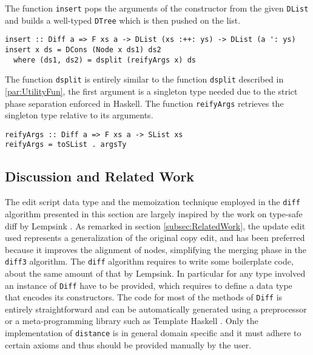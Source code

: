 \documentclass[../Thesis.tex]{subfiles}
\begin{document}
	The function \texttt{insert} pops the arguments of the 
	constructor from the given \texttt{DList} and builds
	a well-typed \texttt{DTree} which is then pushed on the list.

\begin{verbatim}
insert :: Diff a => F xs a -> DList (xs :++: ys) -> DList (a ': ys)
insert x ds = DCons (Node x ds1) ds2
  where (ds1, ds2) = dsplit (reifyArgs x) ds
\end{verbatim}

	The function \texttt{dsplit} is entirely similar to the function
	\texttt{dsplit} described in \ref{par:UtilityFun}, the first 
	argument is a singleton type needed due to the strict
	phase separation enforced in Haskell.
	The function \texttt{reifyArgs} retrieves the singleton
	type relative to its arguments.

\begin{verbatim}
reifyArgs :: Diff a => F xs a -> SList xs
reifyArgs = toSList . argsTy
\end{verbatim}

	\subsection{Discussion and Related Work}
	The edit script data type and the memoization technique 
	employed in the \texttt{diff} algorithm presented in this section
	are largely inspired by the work on type-safe diff by 
	Lempsink \cite{Lemp09}.
	As remarked in section \ref{subsec:RelatedWork}, the update
	edit used represents a generalization of the original copy edit, 
	and has been preferred because it improves the alignment of nodes, 
	simplifying the merging phase in the \texttt{diff3} algorithm.
	The \texttt{diff} algorithm requires to write some boilerplate code, about
	the same amount of that by Lempsink.
	In particular for any type involved an instance of \texttt{Diff} have
	to be provided, which requires to define a data type that encodes its
	constructors.
	The code for most of the methods of \texttt{Diff} is
	entirely straightforward and can be automatically generated using
	a preprocessor or a meta-programming library such as Template Haskell
	\cite{TemplateHaskell}. Only the implementation of \texttt{distance}
	is in general domain specific and it must adhere to certain axioms and thus 
	should	be provided manually by the user.
\end{document}
